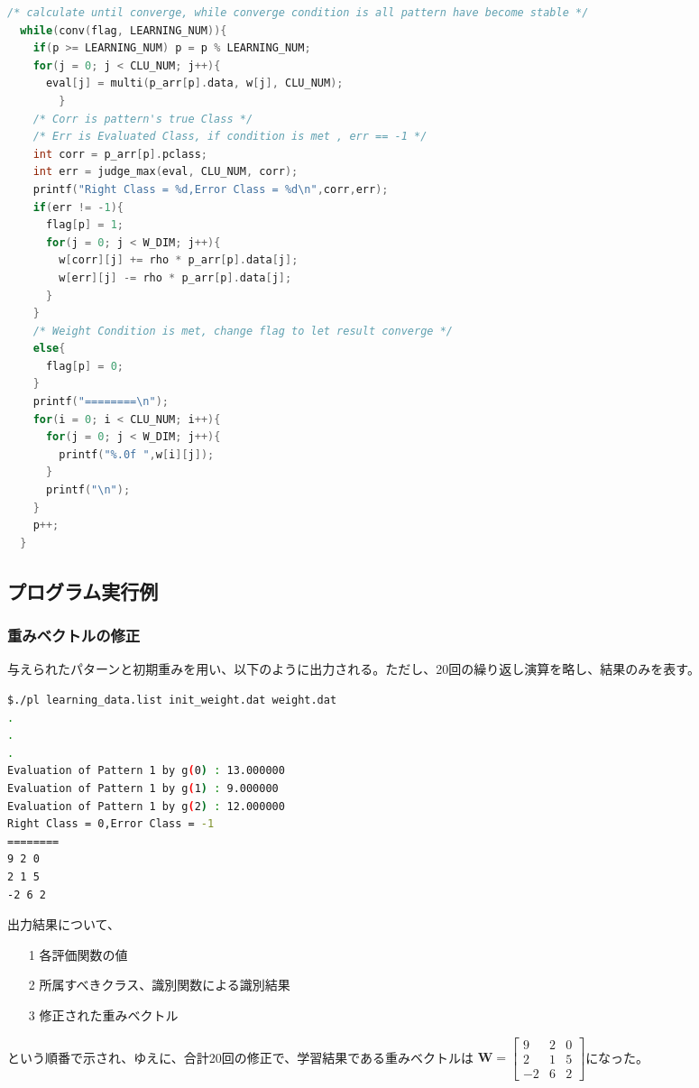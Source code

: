 \documentclass[ %
  uplatex,%
  papersize%
]{jsarticle}
\begin{document}
\begin{lstlisting}[language=c,caption=correct weight vector,]
 /* calculate until converge, while converge condition is all pattern have become stable */
  while(conv(flag, LEARNING_NUM)){
    if(p >= LEARNING_NUM) p = p % LEARNING_NUM;
    for(j = 0; j < CLU_NUM; j++){
      eval[j] = multi(p_arr[p].data, w[j], CLU_NUM);
        }
    /* Corr is pattern's true Class */
    /* Err is Evaluated Class, if condition is met , err == -1 */
    int corr = p_arr[p].pclass;
    int err = judge_max(eval, CLU_NUM, corr);
    printf("Right Class = %d,Error Class = %d\n",corr,err);
    if(err != -1){
      flag[p] = 1;
      for(j = 0; j < W_DIM; j++){
        w[corr][j] += rho * p_arr[p].data[j];
        w[err][j] -= rho * p_arr[p].data[j];
      }
    }
    /* Weight Condition is met, change flag to let result converge */
    else{
      flag[p] = 0;
    }
    printf("========\n");
    for(i = 0; i < CLU_NUM; i++){
      for(j = 0; j < W_DIM; j++){
        printf("%.0f ",w[i][j]);
      }
      printf("\n");
    }
    p++;
  }
\end{lstlisting}

\subsection{プログラム実行例}
\subsubsection{重みベクトルの修正}
与えられたパターンと初期重みを用い、以下のように出力される。ただし、20回の繰り返し演算を略し、結果のみを表す。
\begin{lstlisting}[language=bash]
$./pl learning_data.list init_weight.dat weight.dat
.
.
.
Evaluation of Pattern 1 by g(0) : 13.000000
Evaluation of Pattern 1 by g(1) : 9.000000
Evaluation of Pattern 1 by g(2) : 12.000000
Right Class = 0,Error Class = -1
========
9 2 0
2 1 5
-2 6 2
\end{lstlisting}

出力結果について、

\begin{itemize}
\item[1] 各評価関数の値
\item[2] 所属すべきクラス、識別関数による識別結果
\item[3] 修正された重みベクトル
\end{itemize}

という順番で示され、ゆえに、合計20回の修正で、学習結果である重みベクトルは
$\bm{W} = 
 \begin{bmatrix}
   9 & 2 & 0 \\
   2 & 1 & 5 \\
   -2 & 6 & 2
  \end{bmatrix}
$になった。
\end{document}
